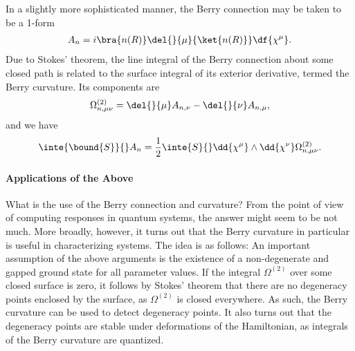 In a slightly more sophisticated manner, the Berry connection may be taken to be a 1-form
\begin{align*}
	A_{n} = i\bra{n(R)}\del{}{\mu}{\ket{n(R)}}\df{\chi^{\mu}}.
\end{align*}
Due to Stokes' theorem, the line integral of the Berry connection about some closed path is related to the surface integral of its exterior derivative, termed the Berry curvature. Its components are
\begin{align*}
	\Omega^{(2)}_{n, \mu\nu} = \del{}{\mu}A_{n, \nu} - \del{}{\nu}A_{n, \mu},
\end{align*}
and we have
\begin{align*}
	\inte{\bound{S}}{}A_{n} = \frac{1}{2}\inte{S}{}\dd{\chi^{\mu}}\wedge\dd{\chi^{\nu}}\Omega^{(2)}_{n, \mu\nu}.
\end{align*}

\paragraph{Applications of the Above}
What is the use of the Berry connection and curvature? From the point of view of computing responses in quantum systems, the answer might seem to be not much. More broadly, however, it turns out that the Berry curvature in particular is useful in characterizing systems. The idea is as follows: An important assumption of the above arguments is the existence of a non-degenerate and gapped ground state for all parameter values. If the integral $\Omega^{(2)}$ over some closed surface is zero, it follows by Stokes' theorem that there are no degeneracy points enclosed by the surface, as $\Omega^{(2)}$ is closed everywhere. As such, the Berry curvature can be used to detect degeneracy points. It also turns out that the degeneracy points are stable under deformations of the Hamiltonian, as integrals of the Berry curvature are quantized.

